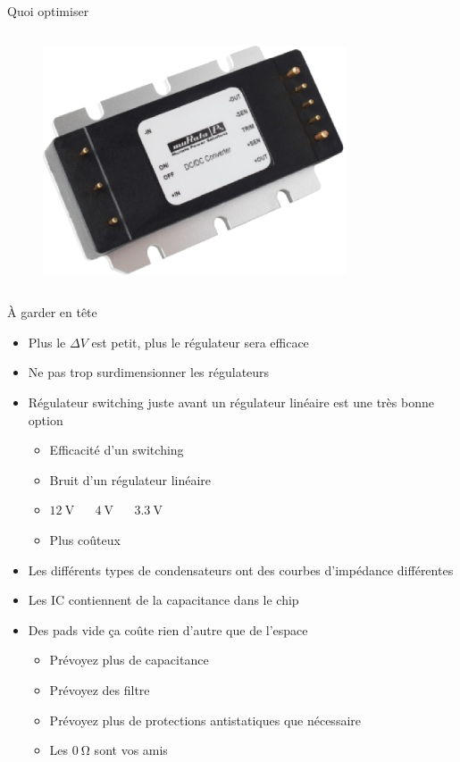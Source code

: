 \begin{frame}{Quoi optimiser}
\begin{columns}
\begin{column}{0.5\textwidth}
            \vfill
            \begin{figure}
                \includegraphics[width=0.8\textwidth, height=0.33\textheight, keepaspectratio]{pictures/ire-q12.png}
            \end{figure}
        \end{column}
    \end{columns}
\end{frame}

\begin{frame}{À garder en tête}
    \begin{itemize}
        \item Plus le $\Delta V$ est petit, plus le régulateur sera efficace
        \item Ne pas trop surdimensionner les régulateurs
        \item Régulateur switching juste avant un régulateur linéaire est une très bonne option
        \begin{itemize}
            \item Efficacité d'un switching
            \item Bruit d'un régulateur linéaire
            \item $\SI{12}{\volt}$
                  ~\faLongArrowAltRight
                  ~$\SI{4}{\volt}$ 
                  ~\faLongArrowAltRight
                  ~$\SI{3.3}{\volt}$
            \item Plus coûteux
        \end{itemize}
        \item Les différents types de condensateurs ont des courbes d'impédance différentes
        \item Les IC contiennent de la capacitance dans le chip
        \item Des pads vide ça coûte rien d'autre que de l'espace
        \begin{itemize}
            \item Prévoyez plus de capacitance
            \item Prévoyez des filtre
            \item Prévoyez plus de protections antistatiques que nécessaire
            \item Les $\SI{0}{\ohm}$ sont vos amis
        \end{itemize}
    \end{itemize}
\end{frame}